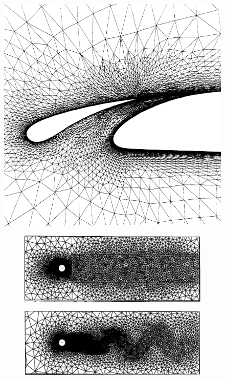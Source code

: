 \begin{figure}
\centering
\begin{minipage}[b]{.4\textwidth}
	\centering
	\includegraphics[width=\linewidth]{img/intro/lit/mavri.png}
	\caption{Illustration of adaptively refined mesh for a two-element airfoil configuration near the gap region \cite{mavriplis1990adaptive}.}
	\label{fig-mavri}
\end{minipage}\hfill
\begin{minipage}[b]{.55\textwidth}
	\centering
	\begin{subfigure}{\linewidth}
	\centering
	\includegraphics[width=\linewidth]{img/intro/lit/castroInitial.png}
	\caption{}
	\label{fig-castroInitial}
	\end{subfigure}
	\begin{subfigure}{\linewidth}
		\centering
		\includegraphics[width=\linewidth]{img/intro/lit/castro.png}

\end{subfigure}
\end{minipage}
\end{figure}
